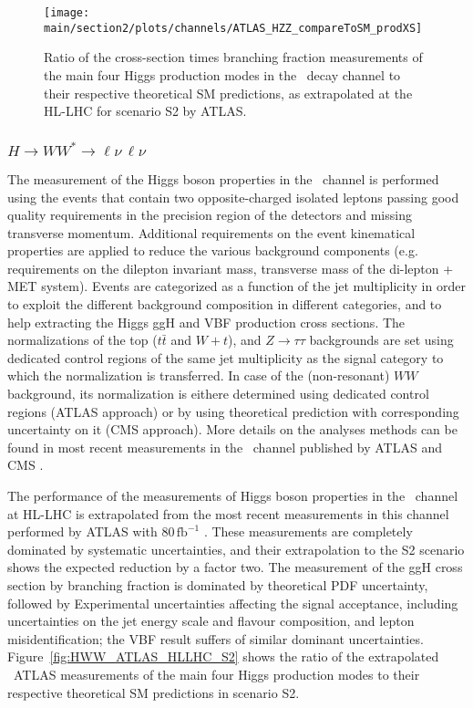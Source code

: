 \begin{figure}
  \centering
  \texttt{[image: \\main/section2/plots/channels/ATLAS\_HZZ\_compareToSM\_prodXS]}
  \caption{Ratio of the cross-section times branching fraction measurements of the main four Higgs production modes in the \HZZ\ decay channel to their respective theoretical SM predictions, as extrapolated at the HL-LHC for scenario S2 by ATLAS.}
  \label{fig:HZZ_ATLAS_HLLHC_S2}
\end{figure}

\subsubsection{$H \to WW^* \to \ell\nu\,\ell\nu$}

The measurement of the Higgs boson properties in the \HWW\ channel is performed using the events that contain two opposite-charged isolated leptons passing good quality requirements in the precision region of the detectors and missing transverse momentum. Additional requirements on the event kinematical properties are applied to reduce the various background components (e.g. requirements on the dilepton invariant mass, transverse mass of the di-lepton + MET system). Events are categorized as a function of the jet multiplicity in order to exploit the different background composition in different categories, and to help extracting the Higgs ggH and VBF production cross sections. The normalizations of the top ($t\bar{t}$ and $W+t$), and $Z\rightarrow\tau\tau$ backgrounds are set using dedicated control regions of the same jet multiplicity as the signal category to which the normalization is transferred. In case of the (non-resonant) $WW$ background, its normalization is eithere determined using dedicated control regions (ATLAS approach) or by using theoretical prediction with corresponding uncertainty on it (CMS approach). More details on the analyses methods can be found in most recent measurements in the \HWW\ channel published by ATLAS \cite{Aaboud:2018jqu} and CMS \cite{Sirunyan:2018egh}.

The performance of the measurements of Higgs boson properties in the \HWW\ channel at HL-LHC is extrapolated from the most recent measurements in this channel performed by ATLAS with 80\,$\mathrm{fb}^{-1}$ \cite{Aaboud:2018jqu}. These measurements are completely dominated by systematic uncertainties, and their extrapolation to the S2 scenario shows the expected reduction by a factor two. The measurement of the ggH cross section by branching fraction is dominated by theoretical PDF uncertainty, followed by Experimental uncertainties affecting the signal acceptance, including uncertainties on the jet energy scale and flavour composition, and lepton misidentification; the VBF result suffers of similar dominant uncertainties.
Figure~\ref{fig:HWW_ATLAS_HLLHC_S2} shows the ratio of the extrapolated \HWW\ ATLAS measurements of the main four Higgs production modes to their respective theoretical SM predictions in scenario S2.


